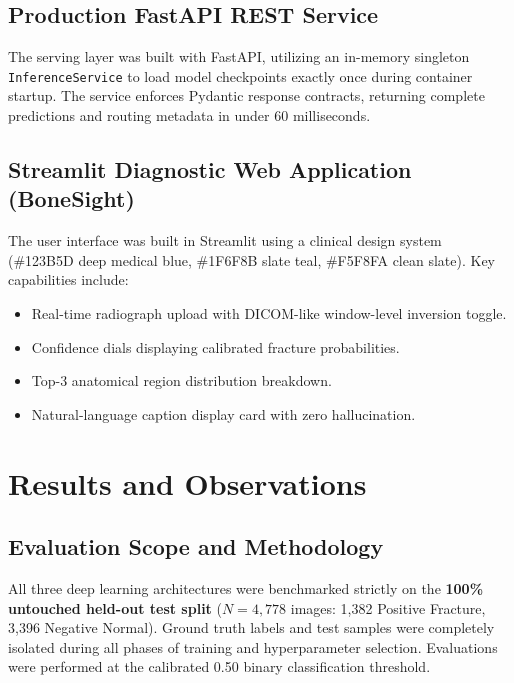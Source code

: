 \documentclass[12pt, a4paper]{report}
\begin{document}
\section{Production FastAPI REST Service}
The serving layer was built with FastAPI, utilizing an in-memory singleton \texttt{InferenceService} to load model checkpoints exactly once during container startup. The service enforces Pydantic response contracts, returning complete predictions and routing metadata in under 60 milliseconds.

\section{Streamlit Diagnostic Web Application (BoneSight)}
The user interface was built in Streamlit using a clinical design system (\#123B5D deep medical blue, \#1F6F8B slate teal, \#F5F8FA clean slate). Key capabilities include:
\begin{itemize}
    \item Real-time radiograph upload with DICOM-like window-level inversion toggle.
    \item Confidence dials displaying calibrated fracture probabilities.
    \item Top-3 anatomical region distribution breakdown.
    \item Natural-language caption display card with zero hallucination.
\end{itemize}

\newpage
\chapter{Results and Observations}

\section{Evaluation Scope and Methodology}
All three deep learning architectures were benchmarked strictly on the \textbf{100\% untouched held-out test split} ($N=4,778$ images: 1,382 Positive Fracture, 3,396 Negative Normal). Ground truth labels and test samples were completely isolated during all phases of training and hyperparameter selection. Evaluations were performed at the calibrated 0.50 binary classification threshold.
\end{document}
